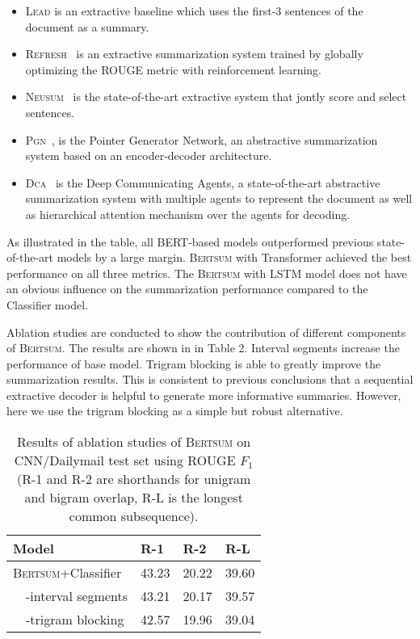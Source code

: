         
    \begin{itemize}
        \item \textsc{Lead} is an extractive baseline which uses the first-3 sentences of the document as a summary.
        
        \item  \textsc{Refresh}~\citep{narayan2018ranking} is an extractive
        summarization system trained by globally optimizing the ROUGE
        metric with reinforcement learning.  
        
        \item \textsc{Neusum}~\citep{zhou2018neural} is the state-of-the-art extractive system that jontly score and select sentences.
        \item  
        \textsc{Pgn}~\citep{see-acl17}, is the Pointer Generator Network, an abstractive summarization system based
        on an encoder-decoder architecture.  
        
        \item \textsc{Dca}~\citep{celikyilmaz2018deep} is the Deep Communicating Agents, a
        state-of-the-art abstractive summarization system with 
        multiple agents  to represent the document as well as
        hierarchical attention mechanism over the agents for decoding.
    \end{itemize}   

    
      As illustrated in the table, all   BERT-based models outperformed previous state-of-the-art models by a large margin. \textsc{Bertsum} with Transformer achieved the best performance on all three metrics. The \textsc{Bertsum} with LSTM model does not have an obvious influence on the summarization performance compared to the  Classifier model. 
    
    Ablation studies  are conducted to show the contribution of different components of \textsc{Bertsum}. The results are shown in in Table 2. Interval segments  increase the performance of base model. Trigram blocking is able to greatly improve the summarization results. This is consistent to previous conclusions that a sequential extractive decoder is helpful to generate more informative summaries. However, here we  use the trigram blocking as a simple but robust alternative.

        \begin{table}[!htbp]
    \begin{tabular}{l|lll}
        Model              & R-1    & R-2    & R-L    \\ \hline
        \textsc{Bertsum}+Classifier  & 43.23  & 20.22 & 39.60\\
        ~~-interval segments & 43.21 & 20.17 &  39.57 \\
        ~~-trigram blocking  & 42.57  & 19.96 & 39.04
    \end{tabular}
    \caption{Results of ablation studies of \textsc{Bertsum} on CNN/Dailymail test set using  ROUGE $F_1$ (R-1 and R-2 are
        shorthands for unigram and bigram overlap, R-L  is the
        longest common subsequence).}
    
\end{table}

